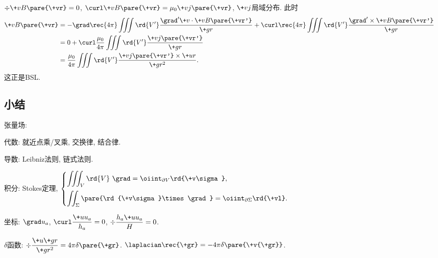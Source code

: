 \documentclass[hidelinks]{ctexart}
\begin{document}
\begin{ex}
    $\div \+vB\pare{\+vr} = 0$, $\curl \+vB\pare{\+vr} = \mu_0 \+vj\pare{\+vr}$, $\+vj$局域分布. 此时
    \begin{align*}
        \+vB\pare{\+vr} &= -\grad \rec{4\pi} \iiint \rd{V'} \frac{\grad'\+v\cdot \+vB\pare{\+vr'}}{\+gr} + \curl \rec{4\pi} \iiint \rd{V'} \frac{\grad'\times \+vB\pare{\+vr'}}{\+gr} \\
        &= 0 + \curl \frac{\mu_0}{4\pi} \iiint \rd{V'} \frac{\+vj\pare{\+vr'}}{\+gr} \\
        &= \frac{\mu_0}{4\pi}\iiint \rd{V'} \frac{\+vj\pare{\+vr'}\times \+ur}{\+gr^2}.
    \end{align*}
    这正是BSL.
\end{ex}



\subsection*{小结} %
\label{sub:小结}

\begin{cenum}
    \item 张量场:
    \begin{cenum}
        \item 代数: 就近点乘/叉乘, 交换律, 结合律.
        \item 导数: Leibniz法则, 链式法则.
        \item 积分: Stokes定理, $\displaystyle \begin{cases}
            \displaystyle \iiint_V \rd{V}\ \grad = \oiint_{\partial V}\rd{\+v\sigma}, \\[1em]
            \displaystyle \iint_\Sigma \pare{\rd{\+v\sigma}\times \grad} = \oiint_{\partial \Sigma} \rd{\+vl}.
        \end{cases}$
        \item 坐标: $\grad u_a$, $\displaystyle \curl \frac{\+uu_a}{h_a} = 0$, $\displaystyle \div \frac{h_a \+uu_a}{H} = 0$.
        \item $\delta$函数: $\displaystyle \div \frac{\+u{\+gr}}{\+gr^2} = 4\pi\delta\pare{\+gr}$. $\displaystyle \laplacian \rec{\+gr} = -4\pi\delta\pare{\+v{\+gr}}$.
    \end{cenum}
\end{cenum}


\end{document}
